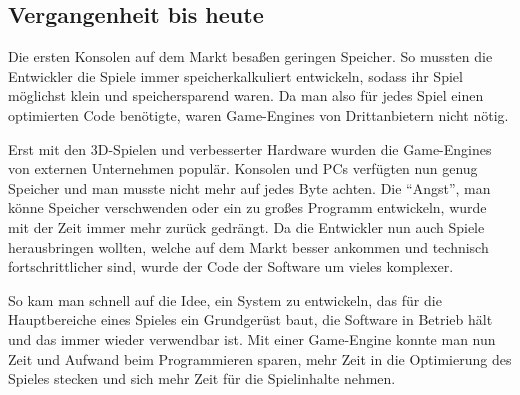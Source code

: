 \subsection{Vergangenheit bis heute}
\label{vergangenheit}
Die ersten Konsolen auf dem Markt besaßen geringen Speicher. So mussten die Entwickler die Spiele immer speicherkalkuliert entwickeln, sodass ihr Spiel möglichst klein und speichersparend waren. Da man also für jedes Spiel einen optimierten Code benötigte, waren Game-Engines von Drittanbietern nicht nötig.

Erst mit den 3D-Spielen und verbesserter Hardware wurden die Game-Engines von externen Unternehmen populär. Konsolen und PCs verfügten nun genug Speicher und man musste nicht mehr auf jedes Byte achten. Die "`Angst"', man könne Speicher verschwenden oder ein zu großes Programm entwickeln, wurde mit der Zeit immer mehr zurück gedrängt.
Da die Entwickler nun auch Spiele herausbringen wollten, welche auf dem Markt besser ankommen und technisch fortschrittlicher sind, wurde der Code der Software um vieles komplexer.\todo{!}

So kam man schnell auf die Idee, ein System zu entwickeln, das für die Hauptbereiche eines Spieles ein Grundgerüst baut, die Software in Betrieb hält und das immer wieder verwendbar ist. Mit einer Game-Engine konnte man nun Zeit und Aufwand beim Programmieren sparen, mehr Zeit in die Optimierung des Spieles stecken und sich mehr Zeit für die Spielinhalte nehmen. 